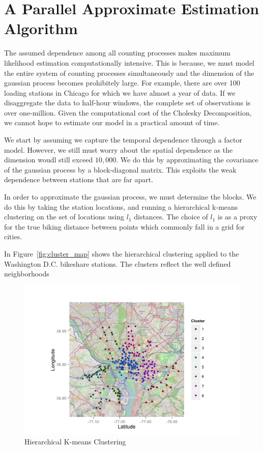 \documentclass{acm_proc_article-sp}
\begin{document}
\section{A Parallel Approximate Estimation Algorithm}

The assumed dependence among all counting processes makes maximum likelihood estimation computationally intensive.  This is because, we must model the entire system of counting processes simultaneously and the dimension of the gaussian process becomes prohibitely large.  For example, there are over 100 loading stations in Chicago for which we have almost a year of data.  If we disaggregate the data to half-hour windows, the complete set of observations is over one-million.  Given the computational cost of the Cholesky Decomposition, we cannot hope to estimate our model in a practical amount of time.

We start by assuming we capture the temporal dependence through a factor model.  However, we still must worry about the spatial dependence as the dimension woudl still exceed $10,000$.   We do this by approximating the covariance of the gaussian process by a block-diagonal matrix. This exploits the weak dependence between stations that are far apart.  

In order to approximate the gaussian process, we must determine the blocks.  We do this by taking the station locations, and running a hierarchical k-means clustering on the set of locations using $l_1$ distances.  The choice of $l_1$ is as a proxy for the true biking distance between points which commonly fall in a grid for cities.

In Figure~\ref{fig:cluster_map} shows the hierarchical clustering applied to the Washington D.C. bikeshare stations.  The clusters reflect the well defined neighborhoods 

\begin{figure} [!h]
\caption{Hierarchical K-means Clustering}
\centering
\includegraphics[scale = 0.2]{cluster_map.png}
\end{figure}
\end{document}
